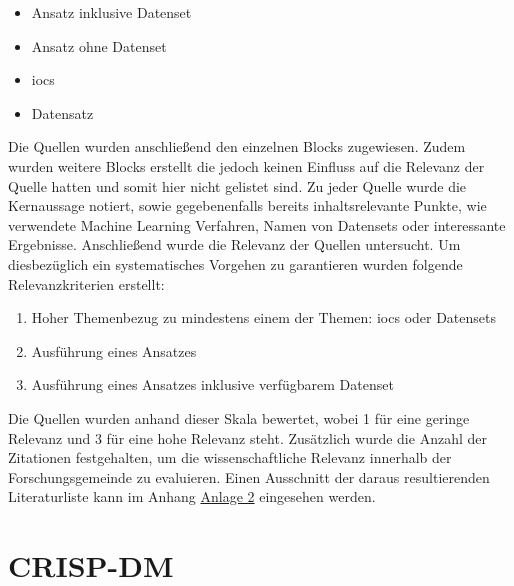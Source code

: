 \documentclass[
    12pt, %
    DIV10,
    ngerman, %
    a4paper, %
    oneside, %
    titlepage, %
    parskip=half, %
    headings=normal, %
    listof=totoc, %
    bibliography=totoc, %
    index=totoc, %
    captions=tableheading, %
    final %
]{scrreprt}
\begin{document}
\begin{itemize}
\item Ansatz inklusive Datenset
\item Ansatz ohne Datenset
\item \ac{iocs}
\item Datensatz
\end{itemize}
Die Quellen wurden anschließend den einzelnen Blocks zugewiesen. Zudem wurden weitere Blocks erstellt die jedoch keinen Einfluss auf die Relevanz der Quelle hatten und somit hier nicht gelistet sind. Zu jeder Quelle wurde die Kernaussage notiert, sowie gegebenenfalls bereits inhaltsrelevante Punkte, wie verwendete Machine Learning Verfahren, Namen von Datensets oder interessante Ergebnisse. Anschließend wurde die Relevanz der Quellen untersucht. 
Um diesbezüglich ein systematisches Vorgehen zu garantieren wurden folgende Relevanzkriterien erstellt:
\begin{enumerate}
\item Hoher Themenbezug zu mindestens einem der Themen: \ac{iocs} oder Datensets
\item Ausführung eines Ansatzes
\item Ausführung eines Ansatzes inklusive verfügbarem Datenset
\end{enumerate}
Die Quellen wurden anhand dieser Skala bewertet, wobei 1 für eine geringe Relevanz und 3 für eine hohe Relevanz steht.
Zusätzlich wurde die Anzahl der Zitationen festgehalten, um die wissenschaftliche Relevanz innerhalb der Forschungsgemeinde zu evaluieren. Einen Ausschnitt der daraus resultierenden Literaturliste kann im Anhang \hyperref[literaturr]{Anlage 2} eingesehen werden.
\section{CRISP-DM}
\label{sec:crisp}
%
\end{document}
